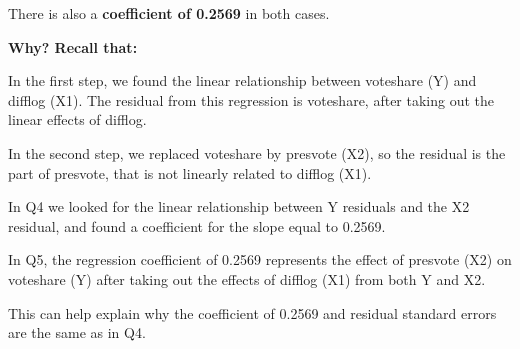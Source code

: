 \documentclass[12pt,letterpaper]{article}
\begin{document}
\begin{enumerate}
		There is also a \textbf{ coefficient of 0.2569} in both cases.
		
	\textbf{Why?	Recall that:}
			
		In the first step, we found the linear relationship between voteshare (Y) and difflog (X1). The residual from this regression is voteshare, after taking out the linear effects of difflog.
		
		In the second step, we replaced voteshare by presvote (X2), so the residual is the part of presvote, that is not linearly related to difflog (X1).
		
		In Q4 we looked for the linear relationship between Y residuals and the X2 residual, and found a coefficient for the slope equal to 0.2569.
		
		In Q5, the regression coefficient of 0.2569 represents the effect of presvote (X2) on voteshare (Y) after taking out the effects of difflog (X1) from both Y and X2.
		
		This can help explain why the coefficient of 0.2569 and residual standard errors are the same as in Q4.
		
	\end{enumerate}
\end{document}
